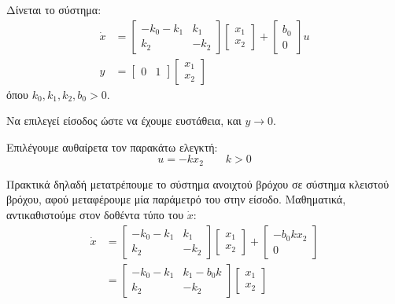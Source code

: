 \documentclass[11pt,a4paper,notitlepage,fleqn]{article}
\begin{document}
\begin{exercise}[Παράδειγμα]
	Δίνεται το σύστημα:
	\begin{align*}
	\dot x &= \left[
	\begin{matrix}
	-k_0-k_1 & k_1 \\
	k_2 & -k_2
	\end{matrix}
	\right]\left[\begin{matrix}
	x_1 \\ x_2
	\end{matrix}\right] + \left[
	\begin{matrix}
	b_0 \\ 0
	\end{matrix}
	\right]u \\
	y &= \left[
	\begin{matrix}
	0 & 1
	\end{matrix}
	\right]\left[\begin{matrix}
	x_1 \\ x_2
	\end{matrix}\right]
	\end{align*}
	όπου \( k_0,k_1,k_2,b_0 > 0 \).

	Να επιλεγεί είσοδος ώστε να έχουμε ευστάθεια, και \( y \to 0 \).

	\tcblower

	Επιλέγουμε αυθαίρετα τον παρακάτω ελεγκτή:
	\[
	u = -kx_2\qquad k>0
	\]

	Πρακτικά δηλαδή μετατρέπουμε το σύστημα ανοιχτού βρόχου σε σύστημα κλειστού
	βρόχου, αφού μεταφέρουμε μία παράμετρό του στην είσοδο. Μαθηματικά,
	αντικαθιστούμε στον δοθέντα τύπο του \( \dot x \):
	\begin{align*}
		\dot x &= \left[\begin{matrix}
		-k_0-k_1 & k_1 \\ k_2 & -k_2
		\end{matrix}\right]\left[\begin{matrix}
		x_1 \\ x_2
		\end{matrix}\right] + \left[\begin{matrix}
		-b_0kx_2 \\ 0
		\end{matrix}\right]
		\\ &=
		\left[\begin{matrix}
		-k_0 - k_1 & k_1-b_0k \\
		k_2 & -k_2
		\end{matrix}\right]\left[\begin{matrix}
		x_1 \\ x_2
		\end{matrix}\right]
	\end{align*}


\end{exercise}
\end{document}
